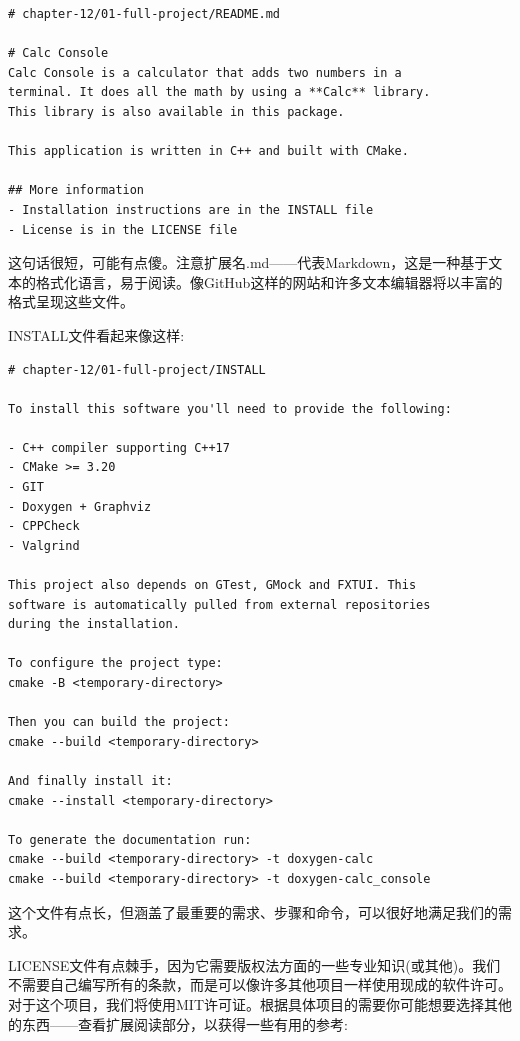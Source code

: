 \begin{lstlisting}[style=stylePython]
# chapter-12/01-full-project/README.md

# Calc Console
Calc Console is a calculator that adds two numbers in a
terminal. It does all the math by using a **Calc** library.
This library is also available in this package.

This application is written in C++ and built with CMake.

## More information
- Installation instructions are in the INSTALL file
- License is in the LICENSE file
\end{lstlisting}

这句话很短，可能有点傻。注意扩展名.md——代表Markdown，这是一种基于文本的格式化语言，易于阅读。像GitHub这样的网站和许多文本编辑器将以丰富的格式呈现这些文件。

INSTALL文件看起来像这样:

\begin{lstlisting}[style=stylePython]
# chapter-12/01-full-project/INSTALL

To install this software you'll need to provide the following:

- C++ compiler supporting C++17
- CMake >= 3.20
- GIT
- Doxygen + Graphviz
- CPPCheck
- Valgrind

This project also depends on GTest, GMock and FXTUI. This
software is automatically pulled from external repositories
during the installation.

To configure the project type:
cmake -B <temporary-directory>

Then you can build the project:
cmake --build <temporary-directory>

And finally install it:
cmake --install <temporary-directory>

To generate the documentation run:
cmake --build <temporary-directory> -t doxygen-calc
cmake --build <temporary-directory> -t doxygen-calc_console
\end{lstlisting}

这个文件有点长，但涵盖了最重要的需求、步骤和命令，可以很好地满足我们的需求。

LICENSE文件有点棘手，因为它需要版权法方面的一些专业知识(或其他)。我们不需要自己编写所有的条款，而是可以像许多其他项目一样使用现成的软件许可。对于这个项目，我们将使用MIT许可证。根据具体项目的需要你可能想要选择其他的东西——查看扩展阅读部分，以获得一些有用的参考:

